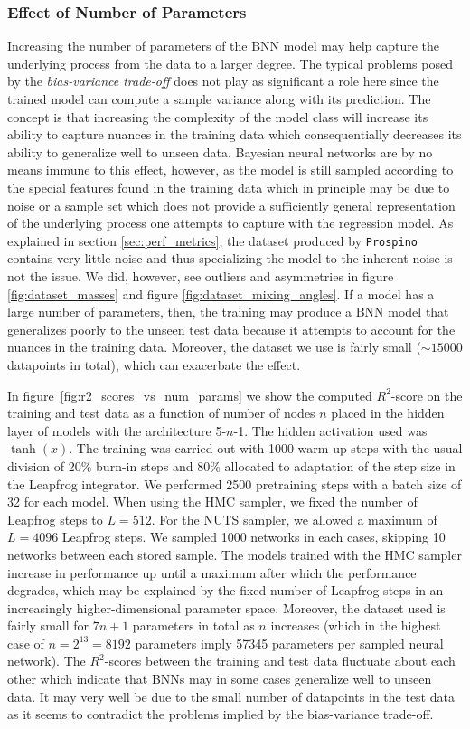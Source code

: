 \subsubsection{Effect of Number of Parameters}
Increasing the number of parameters of the BNN model may help capture the underlying process from the data to a larger degree. The typical problems posed by the \textit{bias-variance trade-off} \cite{ml_for_physicists} does not play as significant a role here since the trained model can compute a sample variance along with its prediction. The concept is that increasing the complexity of the model class will increase its ability to capture nuances in the training data which consequentially decreases its ability to generalize well to unseen data. Bayesian neural networks are by no means immune to this effect, however, as the model is still sampled according to the special features found in the training data which in principle may be due to noise or a sample set which does not provide a sufficiently general representation of the underlying process one attempts to capture with the regression model. As explained in section \ref{sec:perf_metrics}, the dataset produced by {\tt Prospino} contains very little noise and thus specializing the model to the inherent noise is not the issue. We did, however, see outliers and asymmetries in figure \ref{fig:dataset_masses} and figure \ref{fig:dataset_mixing_angles}. If a model has a large number of parameters, then, the training may produce a BNN model that generalizes poorly to the unseen test data because it attempts to account for the nuances in the training data. Moreover, the dataset we use is fairly small ($\sim 15000$ datapoints in total), which can exacerbate the effect.

In figure~\ref{fig:r2_scores_vs_num_params} we show the computed $R^2$-score on the training and test data as a function of number of nodes $n$ placed in the hidden layer of models with the architecture 5-$n$-1. The hidden activation used was $\tanh(x)$. The training was carried out with 1000 warm-up steps with the usual division of 20\% burn-in steps and 80\% allocated to adaptation of the step size in the Leapfrog integrator. We performed 2500 pretraining steps with a batch size of 32 for each model. When using the HMC sampler, we fixed the number of Leapfrog steps to $L = 512$. For the NUTS sampler, we allowed a maximum of $L = 4096$ Leapfrog steps. We sampled 1000 networks in each cases, skipping 10 networks between each stored sample. The models trained with the HMC sampler increase in performance up until a maximum after which the performance degrades, which may be explained by the fixed number of Leapfrog steps in an increasingly higher-dimensional parameter space. Moreover, the dataset used is fairly small for $7n + 1$ parameters in total as $n$ increases (which in the highest case of $n = 2^{13} = 8192$ parameters imply 57345 parameters per sampled neural network). The $R^2$-scores between the training and test data fluctuate about each other which indicate that BNNs may in some cases generalize well to unseen data. It may very well be due to the small number of datapoints in the test data as it seems to contradict the problems implied by the bias-variance trade-off.

